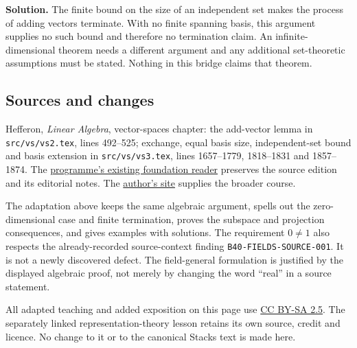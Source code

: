 \documentclass[
  english,
]{article}
\begin{document}
\textbf{Solution.} The finite bound on the size of an independent set
makes the process of adding vectors terminate. With no finite spanning
basis, this argument supplies no such bound and therefore no termination
claim. An infinite-dimensional theorem needs a different argument and
any additional set-theoretic assumptions must be stated. Nothing in this
bridge claims that theorem.

\subsection{Sources and changes}\label{sources-and-changes}

Hefferon, \emph{Linear Algebra}, vector-spaces chapter: the add-vector
lemma in \texttt{src/vs/vs2.tex}, lines 492--525; exchange, equal basis
size, independent-set bound and basis extension in
\texttt{src/vs/vs3.tex}, lines 1657--1779, 1818--1831 and 1857--1874.
The
\href{https://kokunoyumeto.github.io/program-matematika-indonesia/en/readers/hefferon-foundations/}{programme's
existing foundation reader} preserves the source edition and its
editorial notes. The \href{https://hefferon.net/linearalgebra/}{author's
site} supplies the broader course.

The adaptation above keeps the same algebraic argument, spells out the
zero-dimensional case and finite termination, proves the subspace and
projection consequences, and gives examples with solutions. The
requirement \(0\ne1\) also respects the already-recorded source-context
finding \texttt{B40-FIELDS-SOURCE-001}. It is not a newly discovered
defect. The field-general formulation is justified by the displayed
algebraic proof, not merely by changing the word ``real'' in a source
statement.

All adapted teaching and added exposition on this page use
\href{https://creativecommons.org/licenses/by-sa/2.5/}{CC BY-SA 2.5}.
The separately linked representation-theory lesson retains its own
source, credit and licence. No change to it or to the canonical Stacks
text is made here.
\end{document}
